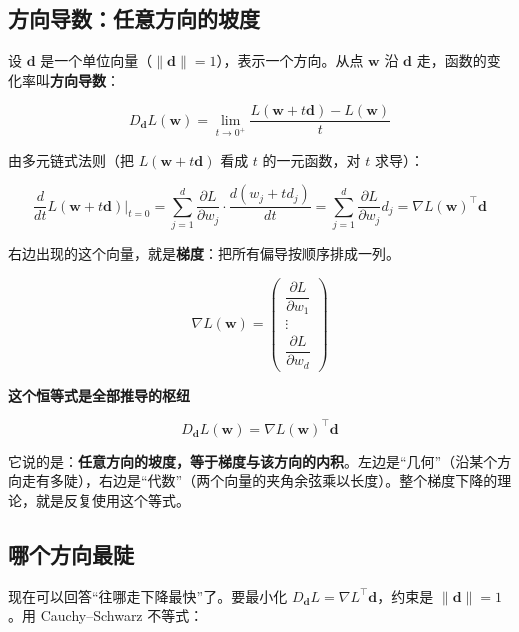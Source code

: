\documentclass[UTF8, a4paper, zihao=-4, fontset=none]{ctexart}
\begin{document}
\subsection{方向导数：任意方向的坡度}



设 $\mathbf{d}$ 是一个单位向量（$\|\mathbf{d}\|=1$），表示一个方向。从点 $\mathbf{w}$ 沿 $\mathbf{d}$ 走，函数的变化率叫\textbf{方向导数}：


\[
D_{\mathbf{d}}L(\mathbf{w})=\lim_{t\to0^+}\frac{L(\mathbf{w}+t\mathbf{d})-L(\mathbf{w})}{t}
\]


由多元链式法则（把 $L(\mathbf{w}+t\mathbf{d})$ 看成 $t$ 的一元函数，对 $t$ 求导）：


\[
\frac{d}{dt}L(\mathbf{w}+t\mathbf{d})\Big|_{t=0}
=\sum_{j=1}^{d}\frac{\partial L}{\partial w_j}\cdot\frac{d(w_j+td_j)}{dt}
=\sum_{j=1}^{d}\frac{\partial L}{\partial w_j}d_j
=\nabla L(\mathbf{w})^\top\mathbf{d}
\]


右边出现的这个向量，就是\textbf{梯度}：把所有偏导按顺序排成一列。


\[
\nabla L(\mathbf{w})=\begin{pmatrix}\dfrac{\partial L}{\partial w_1}\\[6pt]\vdots\\[6pt]\dfrac{\partial L}{\partial w_d}\end{pmatrix}
\]


\begin{goodbox}
{\bfseries\sffamily\small\color{good} 这个恒等式是全部推导的枢纽}\par\vspace{2pt}
\[
D_{\mathbf{d}}L(\mathbf{w})=\nabla L(\mathbf{w})^\top\mathbf{d}
\]


它说的是：\textbf{任意方向的坡度，等于梯度与该方向的内积}。左边是“几何”（沿某个方向走有多陡），右边是“代数”（两个向量的夹角余弦乘以长度）。整个梯度下降的理论，就是反复使用这个等式。


\end{goodbox}




\subsection{哪个方向最陡}



现在可以回答“往哪走下降最快”了。要最小化 $D_{\mathbf{d}}L=\nabla L^\top\mathbf{d}$，约束是 $\|\mathbf{d}\|=1$。用 Cauchy–Schwarz 不等式：
\end{document}
